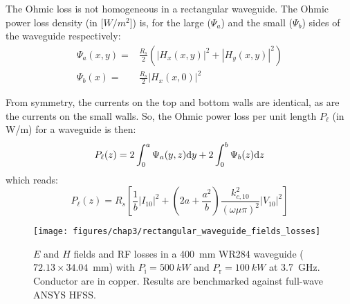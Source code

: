 The Ohmic loss is not homogeneous in a rectangular waveguide. The Ohmic power loss density (in [$\si{W/m^2}$]) is, for the large ($\Psi_a$) and the small ($\Psi_b$) sides of the waveguide respectively:
\begin{subequations}
	\begin{align}
		\Psi_a(x,y)
		=& \frac{R_s}{2} \left(\left| H_x(x,y) \right|^2 + \left| H_y(x,y) \right|^2 \right)
\\
		\Psi_b(x)
		=& \frac{R_s}{2} \left| H_x(x,0) \right|^2 
	\end{align}
\end{subequations}

From symmetry, the currents on the top and bottom walls are identical, as are the currents on the small walls. So, the Ohmic power loss per unit length $P_\ell$ (in \si{W/m}) for a waveguide is then: 
\begin{equation}
P_\ell (z)
= 
2\int_0^a  \Psi_a(y,z) {\mathrm{d}} y 
+ 
2\int_0^b  \Psi_b(z) {\mathrm{d}} z 
\end{equation}
which reads:
\begin{equation}
P_\ell (z)
= 
R_s \left[
	\frac{1}{b} \left| I_{10} \right|^2 
	+ 
	\left(
		2a + \frac{a^2}{b}
	\right)
	\frac{k_{c,10}^2}{(\omega\mu\pi)^2} 
	\left| V_{10} \right|^2 
\right]
\label{eq:rectwg_power_loss_per_unit_length}
\end{equation}

\begin{figure*}
	\centering
	\texttt{[image: figures/chap3/rectangular\_waveguide\_fields\_losses]}
	\caption{$E$ and $H$ fields and RF losses in a 400~\si{mm} WR284 waveguide ($72.13 \times 34.04$~\si{mm}) with $P_\mathrm{i}=500~\si{kW}$ and  $P_\mathrm{r}=100~\si{kW}$ at 3.7~\si{GHz}. Conductor are in copper. Results are  benchmarked against full-wave ANSYS HFSS.}
	\label{fig:rectwg_benchmark_fields}
\end{figure*}


